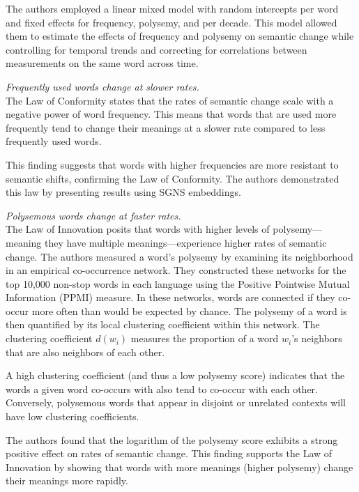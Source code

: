 The authors employed a linear mixed model with random intercepts per word and fixed effects for frequency, polysemy, and per decade.
This model allowed them to estimate the effects of frequency and polysemy on semantic change while controlling for temporal trends and correcting for correlations between measurements on the same word across time.

 \emph{Frequently used words change at slower rates.}\\
The Law of Conformity states that the rates of semantic change scale with a negative power of word frequency.
This means that words that are used more frequently tend to change their meanings at a slower rate compared to less frequently used words.

This finding suggests that words with higher frequencies are more resistant to semantic shifts, confirming the Law of Conformity.
The authors demonstrated this law by presenting results using SGNS embeddings.

 \emph{Polysemous words change at faster rates.}\\
The Law of Innovation posits that words with higher levels of polysemy—meaning they have multiple meanings—experience higher rates of semantic change.
The authors measured a word’s polysemy by examining its neighborhood in an empirical co-occurrence network.
They constructed these networks for the top 10,000 non-stop words in each language using the Positive Pointwise Mutual Information (PPMI) measure.
In these networks, words are connected if they co-occur more often than would be expected by chance.
The polysemy of a word is then quantified by its local clustering coefficient within this network.
The clustering coefficient  $d(w_i)$  measures the proportion of a word  $w_i$’s neighbors that are also neighbors of each other.

A high clustering coefficient (and thus a low polysemy score) indicates that the words a given word co-occurs with also tend to co-occur with each other.
Conversely, polysemous words that appear in disjoint or unrelated contexts will have low clustering coefficients.

The authors found that the logarithm of the polysemy score exhibits a strong positive effect on rates of semantic change.
This finding supports the Law of Innovation by showing that words with more meanings (higher polysemy) change their meanings more rapidly.

